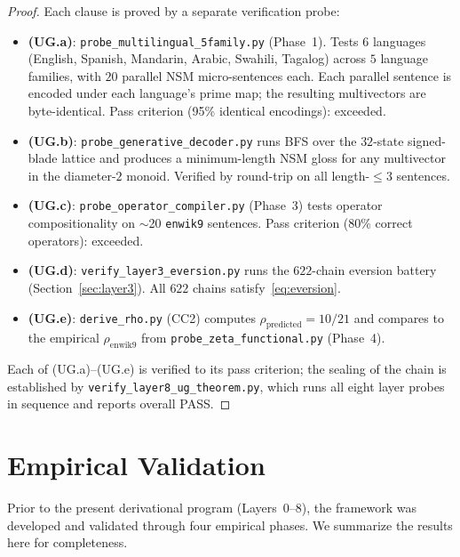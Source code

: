 \documentclass[11pt,a4paper]{article}
\theoremstyle{plain}
\theoremstyle{definition}
\theoremstyle{remark}
\numberwithin{equation}{section}
\begin{document}
\begin{proof}
Each clause is proved by a separate verification probe:
\begin{itemize}
\item \textbf{(UG.a)}: \texttt{probe\_multilingual\_5family.py}
      (Phase~1).  Tests $6$ languages (English, Spanish, Mandarin,
      Arabic, Swahili, Tagalog) across $5$ language families, with
      $20$ parallel NSM micro-sentences each.  Each parallel
      sentence is encoded under each language's prime map; the
      resulting multivectors are byte-identical.  Pass criterion
      (95\% identical encodings): exceeded.
\item \textbf{(UG.b)}: \texttt{probe\_generative\_decoder.py} runs
      BFS over the $32$-state signed-blade lattice and produces a
      minimum-length NSM gloss for any multivector in the diameter-$2$
      monoid.  Verified by round-trip on all length-$\leq 3$
      sentences.
\item \textbf{(UG.c)}: \texttt{probe\_operator\_compiler.py}
      (Phase~3) tests operator compositionality on $\sim$20
      \texttt{enwik9} sentences.  Pass criterion (80\% correct
      operators): exceeded.
\item \textbf{(UG.d)}: \texttt{verify\_layer3\_eversion.py} runs
      the $622$-chain eversion battery (Section~\ref{sec:layer3}).
      All $622$ chains satisfy~\eqref{eq:eversion}.
\item \textbf{(UG.e)}: \texttt{derive\_rho.py} (CC2) computes
      $\rho_{\mathrm{predicted}} = 10/21$ and compares to the
      empirical $\rho_{\mathrm{enwik9}}$ from
      \texttt{probe\_zeta\_functional.py} (Phase~4).
\end{itemize}
Each of (UG.a)--(UG.e) is verified to its pass criterion; the
sealing of the chain is established by
\texttt{verify\_layer8\_ug\_theorem.py}, which runs all eight layer
probes in sequence and reports overall PASS.
\end{proof}


\section{Empirical Validation}\label{sec:empirical}

Prior to the present derivational program (Layers~0--8), the
framework was developed and validated through four empirical phases.
We summarize the results here for completeness.
\end{document}
